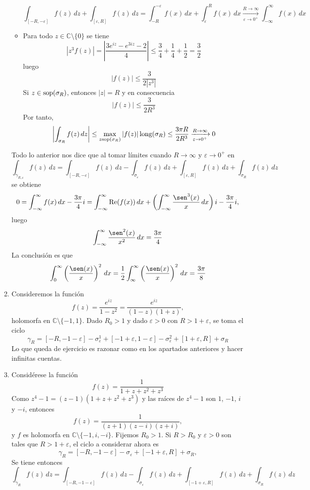 \documentclass[11pt]{report}
\makeatletter
\renewenvironment{proof}[1][\proofname]{\par
  \pushQED{\qed}%
  \normalfont \topsep\z@skip %
  \trivlist
  \item[\hskip\labelsep
        \itshape
    #1\@addpunct{.}]\ignorespaces
}{%
  \popQED\endtrivlist\@endpefalse
}
\newcommand{\C}{\mathbb C}
\makeatother
\begin{document}
\begin{proof}
\begin{enumerate}
\begin{itemize}
  \[\int_{[-R,-\varepsilon]} f(z) \, dz + \int_{[\varepsilon,R]} f(z) \, dz = \int_{-R}^{-\varepsilon} f(x) \, dx + \int_{\varepsilon}^R f(x) \, dx \xrightarrow[\varepsilon \to 0^+]{R \to \infty} \int_{-\infty}^\infty f(x)\, dx\]
  \item Para todo $z \in \C \setminus \{0\}$ se tiene
  \[|z^3f(z)|=\left|\frac{3e^{iz}-e^{3iz}-2}{4}\right| \leq \frac{3}{4}+\frac{1}{4}+\frac{1}{2} = \frac{3}{2}\]
  luego 
  \[|f(z)| \leq \frac{3}{2|z^3|}\]
  Si $z \in \textup{sop}(\sigma_R)$, entonces $|z| = R$ y en consecuencia
  \[|f(z)| \leq \frac{3}{2R^3}\]
  Por tanto,
  \[\left|\int_{\sigma_R} f(z)\, dz\right| \leq \max_{z \textup{sop}(\sigma_R)}|f(z)| \, \textup{long}(\sigma_R) \leq \frac{3\pi R}{2R^3} \xrightarrow[\varepsilon \to 0^+]{R \to \infty} 0\]
\end{itemize}
Todo lo anterior nos dice que al tomar límites cuando $R \to \infty$ y $\varepsilon \to 0^+$ en 
\[\int_{\gamma_{R,\varepsilon}} f(z) \, dz = \int_{[-R,-\varepsilon]}f(z)\, dz-\int_{\sigma_\varepsilon} f(z) \, dz +\int_{[\varepsilon,R]}f(z) \, dz + \int_{\sigma_R} f(z) \, dz\]
se obtiene
\[0 = \int_{-\infty}^\infty f(x) \, dx -\frac{3\pi}{4}i  = \int_{-\infty}^\infty\textup{Re}(f(x))\, dx +\left(\int_{-\infty}^\infty \frac{\sen^3(x)}{x} \, dx \right)i  -\frac{3\pi}{4}i,\]
luego
\[\int_{-\infty}^\infty \frac{\sen^2(x)}{x^2} \, dx = \frac{3\pi}{4}\]
La conclusión es que
\[\int_0^\infty \left(\frac{\sen(x)}{x}\right)^2 \, dx = \frac{1}{2}\int_{\infty}^\infty\left( \frac{\sen(x)}{x}\right)^2\,  dx = \frac{3\pi}{8}\]
\item Consideremos la función
\[f(z)=\frac{e^{iz}}{1-z^2} = \frac{e^{iz}}{(1-z)(1+z)},\]
holomorfa en $\C \setminus \{-1,1\}$. Dado $R_0>1$ y dado $\varepsilon>0$ con $R>1+\varepsilon$, se toma el ciclo
\[\gamma_R = [-R,-1-\varepsilon] -\sigma_{\varepsilon}^1+[-1+\varepsilon,1-\varepsilon]-\sigma_{\varepsilon}^2 +[1+\varepsilon,R]+\sigma_R\]
Lo que queda de ejercicio es razonar como en los apartados anteriores y hacer infinitas cuentas.
\item Considérese la función
\[f(z)=\frac{1}{1+z+z^2+z^3}\]
Como $z^4-1 = (z-1)(1+z+z^2+z^3)$ y las raíces de $z^4-1$ son $1$, $-1$, $i$ y $-i$, entonces
\[f(z)=\frac{1}{(z+1)(z-i)(z+i)},\]
y $f$ es holomorfa en $\C \setminus \{-1,i,-i\}$. Fijemos $R_0>1$. Si $R>R_0$ y $\varepsilon >0$ son tales que $R>1+\varepsilon$, el ciclo a considerar ahora es
\[\gamma_R = [-R,-1-\varepsilon] -\sigma_{\varepsilon}+[-1+\varepsilon,R]+\sigma_R,\]
Se tiene entonces
\[\int_{\gamma_R}f(z) \, dz = \int_{[-R,-1-\varepsilon]}f(z) \, dz-\int_{\sigma_{\varepsilon}}f(z) \, dz+\int_{[-1+\varepsilon,R]}f(z) \, dz+\int_{\sigma_R}f(z) \, dz\]

\end{enumerate}
\end{proof}
\end{document}
